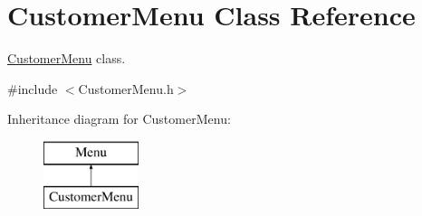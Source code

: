 \hypertarget{classCustomerMenu}{}\section{Customer\+Menu Class Reference}
\label{classCustomerMenu}


\hyperlink{classCustomerMenu}{Customer\+Menu} class.  




{\ttfamily \#include $<$Customer\+Menu.\+h$>$}

Inheritance diagram for Customer\+Menu\+:\begin{figure}[H]
\begin{center}
\leavevmode
\includegraphics[height=2.000000cm]{classCustomerMenu}
\end{center}
\end{figure}
